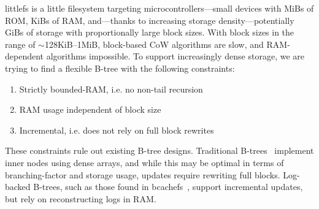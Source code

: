 \documentclass[letterpaper,twocolumn,10pt]{article}
\def\lfs+{littlefs}
\begin{document}
\lfs+ is a little filesystem targeting microcontrollers---small devices with
MiBs of ROM, KiBs of RAM, and---thanks to
increasing storage density---potentially GiBs of storage with
proportionally large block sizes.
With block sizes in the range of {$\sim$}128KiB--1MiB,
block-based CoW algorithms are slow, and
RAM-dependent algorithms impossible.
To support increasingly dense storage, we are trying to find a flexible
B-tree with the following constraints:
\begin{enumerate}
\item Strictly bounded-RAM, i.e. no non-tail recursion
\item RAM usage independent of block size
\item Incremental, i.e. does not rely on full block rewrites
\end{enumerate}

These constraints rule out existing B-tree designs.
Traditional B-trees~\cite{ubiquitous-btree}
implement inner nodes using dense arrays, and while
this may be optimal in terms of branching-factor and storage usage,
updates require rewriting full blocks.
Log-backed B-trees, such as those found in bcachefs~\cite{bcachefs},
support incremental updates, but rely on reconstructing logs in RAM.
\end{document}
